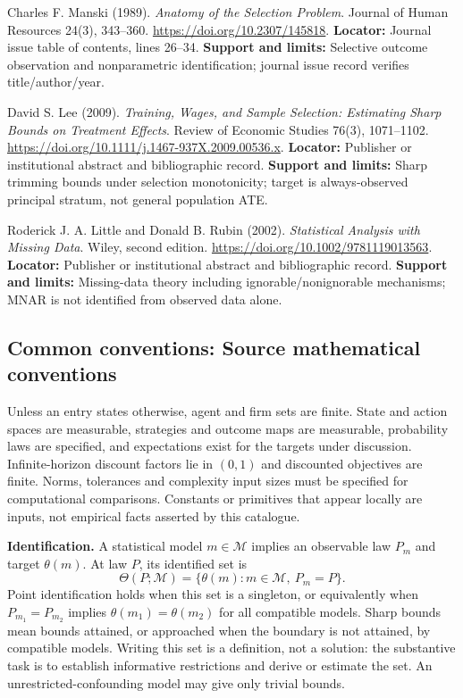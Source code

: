 \documentclass[11pt,a4paper]{article}
\begin{document}
\begin{enumerate}[label={[\textnormal{S}\arabic*]},leftmargin=*]

\item Charles F. Manski (1989). \emph{Anatomy of the Selection Problem}. Journal of Human Resources 24(3), 343–360. \url{https://doi.org/10.2307/145818}. \textbf{Locator:} Journal issue table of contents, lines 26–34. \textbf{Support and limits:} Selective outcome observation and nonparametric identification; journal issue record verifies title/author/year.

\item David S. Lee (2009). \emph{Training, Wages, and Sample Selection: Estimating Sharp Bounds on Treatment Effects}. Review of Economic Studies 76(3), 1071–1102. \url{https://doi.org/10.1111/j.1467-937X.2009.00536.x}. \textbf{Locator:} Publisher or institutional abstract and bibliographic record. \textbf{Support and limits:} Sharp trimming bounds under selection monotonicity; target is always-observed principal stratum, not general population ATE.

\item Roderick J. A. Little and Donald B. Rubin (2002). \emph{Statistical Analysis with Missing Data}. Wiley, second edition. \url{https://doi.org/10.1002/9781119013563}. \textbf{Locator:} Publisher or institutional abstract and bibliographic record. \textbf{Support and limits:} Missing-data theory including ignorable/nonignorable mechanisms; MNAR is not identified from observed data alone.

\end{enumerate}

\subsection*{Common conventions: Source mathematical conventions}

Unless an entry states otherwise, agent and firm sets are finite. State and action spaces are measurable, strategies and outcome maps are measurable, probability laws are specified, and expectations exist for the targets under discussion. Infinite-horizon discount factors lie in $(0,1)$ and discounted objectives are finite. Norms, tolerances and complexity input sizes must be specified for computational comparisons. Constants or primitives that appear locally are inputs, not empirical facts asserted by this catalogue.

\textbf{Identification.} A statistical model $m\in\mathcal M$ implies an observable law $P_m$ and target $\theta(m)$. At law $P$, its identified set is
\[
\Theta(P;\mathcal M)=\{\theta(m):m\in\mathcal M,\ P_m=P\}.
\]
Point identification holds when this set is a singleton, or equivalently when $P_{m_1}=P_{m_2}$ implies $\theta(m_1)=\theta(m_2)$ for all compatible models. Sharp bounds mean bounds attained, or approached when the boundary is not attained, by compatible models. Writing this set is a definition, not a solution: the substantive task is to establish informative restrictions and derive or estimate the set. An unrestricted-confounding model may give only trivial bounds.
\end{document}

